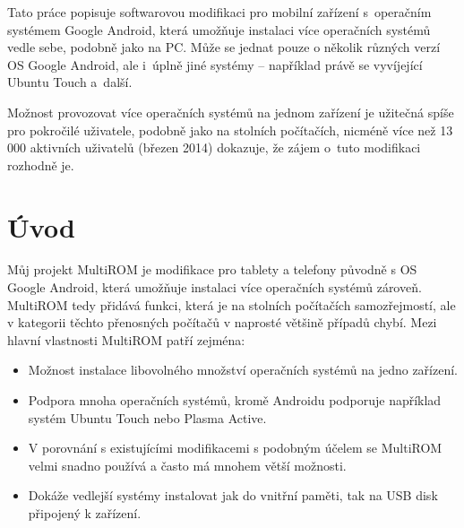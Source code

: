 \documentclass[12pt, a4paper, oneside]{article}
\begin{document}
Tato práce popisuje softwarovou modifikaci pro mobilní zařízení s~operačním systémem Google Android, která umožňuje instalaci více operačních systémů vedle sebe, podobně jako na PC. Může se jednat pouze o několik různých verzí OS Google Android, ale i~úplně jiné systémy -- například právě se vyvíjející Ubuntu Touch a~další.

Možnost provozovat více operačních systémů na jednom zařízení je užitečná spíše pro pokročilé uživatele, podobně jako na stolních počítačích, nicméně více než 13 000 aktivních uživatelů (březen 2014) dokazuje, že zájem o~tuto modifikaci rozhodně je.

\addtolength{\textheight}{30mm} %

\newpage
\pagestyle{plain}

\setlength{\voffset}{-20mm} %
\setcounter{page}{1}  %

\tableofcontents  %

\addtolength{\textheight}{-30mm} %
\newpage
\setlength{\voffset}{0mm} %
\pagestyle{plain}

\section*{Úvod}
\label{uvod}
Můj projekt MultiROM je modifikace pro tablety a telefony původně s OS Google Android, která umožňuje instalaci více operačních systémů zároveň. MultiROM tedy přidává funkci, která je na stolních počítačích samozřejmostí, ale v kategorii těchto přenosných počítačů v naprosté většině případů chybí. Mezi hlavní vlastnosti MultiROM patří zejména:

\begin{itemize}
    \item Možnost instalace libovolného množství operačních systémů na jedno zařízení.
    \item Podpora mnoha operačních systémů, kromě Androidu podporuje například systém Ubuntu Touch nebo Plasma Active.
    \item V porovnání s existujícími modifikacemi s podobným účelem se MultiROM velmi snadno používá a často má mnohem větší možnosti.
    \item Dokáže vedlejší systémy instalovat jak do vnitřní paměti, tak na USB disk připojený k zařízení.
\end{itemize}
\end{document}
